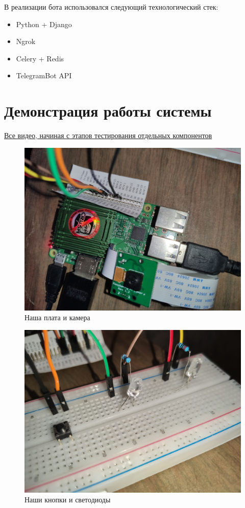 \documentclass[a4paper,11pt]{article}
\begin{document}
\noindent В реализации бота использовался следующий технологический стек:
\begin{itemize}
  \item Python + Django
  \item Ngrok
  \item Celery + Redis
  \item TelegramBot API
\end{itemize}

\section{Демонстрация работы системы}
\href{https://drive.google.com/drive/u/0/folders/17Fis1vASnBp3RG1X3LoO70RmMCvE8m6c}{Все видео, начиная с этапов тестирования отдельных компонентов}
\begin{figure}[h!]
  \begin{center}
    \includegraphics[scale=0.15]{images/апп_1.jpg}
  \caption{Наша плата и камера}
  \end{center}
\end{figure}
\begin{figure}[h!]
  \begin{center}
    \includegraphics[scale=0.15]{images/апп_2.jpg}
  \caption{Наши кнопки и светодиоды}
  \end{center}
\end{figure}
\end{document}
